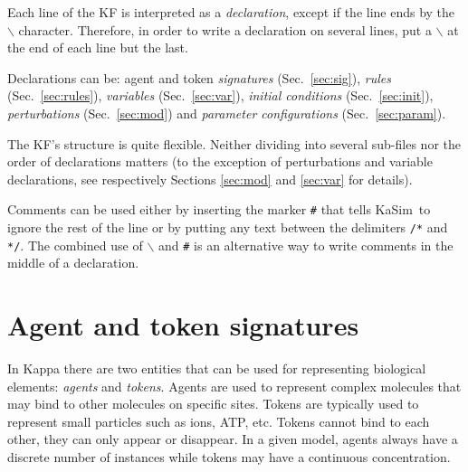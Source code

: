 \documentclass[11pt]{book}
\def\KaSim{\textsf{KaSim}}
\def\ttt#1{\texttt{#1}}
\def\bs{\backslash}
\def\imp#1{\emph{#1}\index{#1}}
\begin{document}
Each line of the KF is interpreted as a
\emph{declaration}, except if the line ends by
the~{\textquotesingle} \ttt{$\bs$}{\textquotesingle}
character. Therefore, in order to write a
declaration on several lines, put a \ttt{$\bs$} at the end of each line but the last.

Declarations can be: agent and token \emph{signatures}
(Sec.~\ref{sec:sig}), \emph{rules} (Sec.~\ref{sec:rules}),
\emph{variables} (Sec.~\ref{sec:var}), \emph{initial
  conditions} (Sec.~\ref{sec:init}),
\emph{perturbations} (Sec.~\ref{sec:mod}) and
\emph{parameter configurations} (Sec.~\ref{sec:param}).

The KF's structure is quite flexible. Neither
dividing into several sub-files nor the order of
declarations matters (to the exception of
perturbations and variable declarations, see
respectively Sections \ref{sec:mod} and \ref{sec:var} for details).

Comments can be used either by inserting the marker
\ttt{\#} that tells \KaSim~to ignore the rest of the line or by
putting any text between the delimiters \ttt{/*} and \ttt{*/}. The
combined use of \ttt{$\bs$} and \ttt{\#} is an alternative way to
write comments in the middle of a declaration.

\section{Agent and token signatures}\label{sec:sig}
%
In Kappa there are two entities that can be used for representing
biological elements: \imp{agents} and \imp{tokens}.  Agents are used
to represent complex molecules that may bind to other molecules on
specific sites. Tokens are typically used to represent small particles
such as ions, ATP, etc. Tokens cannot bind to each other, they can
only appear or disappear. In a given model, agents always have a
discrete number of instances while tokens may have a continuous
concentration.
\end{document}
